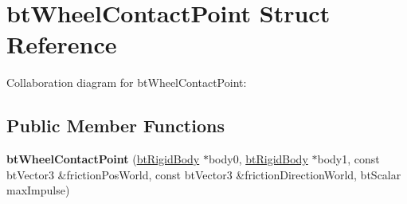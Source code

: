 \hypertarget{structbt_wheel_contact_point}{\section{bt\+Wheel\+Contact\+Point Struct Reference}
\label{structbt_wheel_contact_point}
}


Collaboration diagram for bt\+Wheel\+Contact\+Point\+:
\subsection*{Public Member Functions}
\begin{DoxyCompactItemize}
\item 
\hypertarget{structbt_wheel_contact_point_afb6cf036281d1994930a85f03bf7bba6}{{\bfseries bt\+Wheel\+Contact\+Point} (\hyperlink{classbt_rigid_body}{bt\+Rigid\+Body} $\ast$body0, \hyperlink{classbt_rigid_body}{bt\+Rigid\+Body} $\ast$body1, const bt\+Vector3 \&friction\+Pos\+World, const bt\+Vector3 \&friction\+Direction\+World, bt\+Scalar max\+Impulse)}\label{structbt_wheel_contact_point_afb6cf036281d1994930a85f03bf7bba6}

\end{DoxyCompactItemize}
